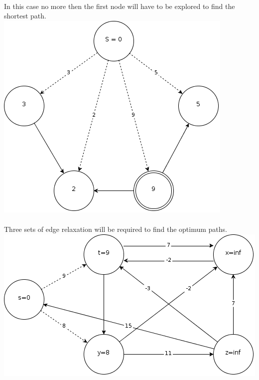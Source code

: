 \documentclass[11pt]{article}
\begin{document}
	\renewcommand{\headrulewidth}{0.4pt}
	\setlength{\headheight}{38.0pt}

	\\
		In this case no more then the first node will have to be explored to find the shortest path.\\
		\includegraphics[scale=.5]{D1.png}\\	
	\newpage
	\\
		Three sets of edge relaxation will be required to find the optimum paths.\\
		\includegraphics[scale=.5]{BF1.png}\\
\end{document}

